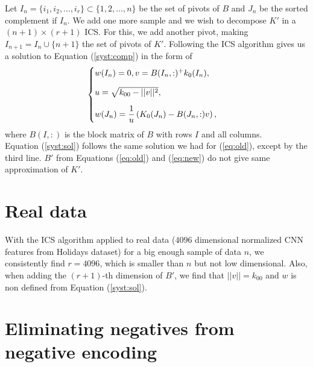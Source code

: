 \documentclass[12pt,letterpaper]{article}
\begin{document}
Let $I_n=\{i_1,i_2,...,i_r\}\subset \{1,2,...,n\}$ be the set of pivots of $B$ and $J_n$ be the sorted complement if $I_n$. 
We add one more sample and we wish to decompose $K'$ in a $(n+1)\times (r+1)$ ICS. 
For this, we add another pivot, making $I_{n+1} = I_n\cup \{n+1\}$ the set of pivots of $K'$. Following the ICS algorithm gives us a solution to Equation (\ref{syst:comp}) in the form of 
\begin{align}
\begin{cases}
\vspace{3 mm}
w(I_n) = 0, v = B(I_n,:)^+k_0(I_n),\\
\vspace{3 mm}
u = \sqrt{k_{00}-||v||^2},\\
w(J_n) = \dfrac{1}{u}\left(K_0(J_n)-B(J_n,:)v \right),
\end{cases}
\end{align}\label{syst:sol}
where $B(I,:)$ is the block matrix of $B$ with rows $I$ and all columns.\\
Equation (\ref{syst:sol}) follows the same solution we had for (\ref{eq:old}), except by the third line. $B'$ from Equations (\ref{eq:old}) and (\ref{eq:new}) do not give same approximation of $K'$.

\section{Real data}
With the ICS algorithm applied to real data ($4096$ dimensional normalized CNN features from Holidays dataset) for a big enough sample of data $n$, we consistently find $r=4096$, which is smaller than $n$ but not low dimensional. 
Also, when adding the $(r+1)$-th dimension of $B'$, we find that $||v||=k_{00}$ and $w$ is non defined from Equation (\ref{syst:sol}).

\section{Eliminating negatives from negative encoding}
\end{document}
